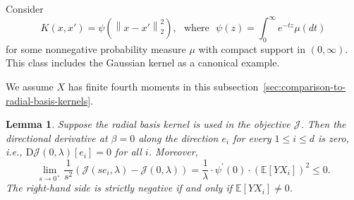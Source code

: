 \documentclass[sn-mathphys-num]{sn-jnl}%
\numberwithin{equation}{section}
\newcommand{\E}{\mathbb{E}}
\newcommand{\kernel}{K}
\newcommand{\norm}[1]{\left\|{#1}\right\|} %
\newtheorem{lemma}{Lemma}
\newcommand{\profile}{\psi}
\theoremstyle{thmstyleone}%
\theoremstyle{thmstyletwo}%
\theoremstyle{thmstylethree}%
\begin{document}
Consider 
\begin{equation*}
	\kernel(x, x') = \profile( \norm{x-x'}_2^2),~~~\text{where}~~~\profile(z) = \int_0^\infty e^{-tz} \mu(dt)
\end{equation*} 
for some nonnegative probability measure $\mu$ with compact support in $(0, \infty)$. This class includes the Gaussian kernel as a canonical example. 

We assume $X$ has finite fourth moments in this subsection~\ref{sec:comparison-to-radial-basis-kernels}.
\vspace{.5em} 
\begin{lemma}
\label{lemma:limitation-of-Gaussian}
Suppose the radial basis kernel is used in the objective $\mathcal{J}$. Then the directional derivative 
at $\beta = 0$ along the direction $e_i$ for every $1 \le i \le d$ is zero, i.e., $\mathrm{D} \mathcal{J}(0, \lambda)[e_i] = 0$ for all $i$. Moreover,
\begin{equation*}
	\lim_{s \to 0^+} \frac{1}{s^2} \left(\mathcal{J}(s e_i, \lambda) - \mathcal{J}(0, \lambda)\right) 
		=  \frac{1}{\lambda} \cdot \profile^\prime(0) \cdot (\E[YX_i])^2 \le 0. 
\end{equation*}
The right-hand side is strictly negative if and only if $\mathbb{E}[Y X_i] \ne 0$.
\end{lemma} 
\end{document}
